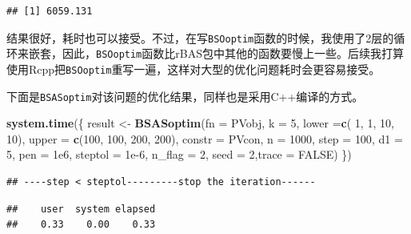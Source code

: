 \documentclass[]{ctexbook}
\newenvironment{Shaded}{\begin{snugshade}}{\end{snugshade}}
\newcommand{\KeywordTok}[1]{\textcolor[rgb]{0.13,0.29,0.53}{\textbf{#1}}}
\newcommand{\DataTypeTok}[1]{\textcolor[rgb]{0.13,0.29,0.53}{#1}}
\newcommand{\DecValTok}[1]{\textcolor[rgb]{0.00,0.00,0.81}{#1}}
\newcommand{\FloatTok}[1]{\textcolor[rgb]{0.00,0.00,0.81}{#1}}
\newcommand{\StringTok}[1]{\textcolor[rgb]{0.31,0.60,0.02}{#1}}
\newcommand{\OtherTok}[1]{\textcolor[rgb]{0.56,0.35,0.01}{#1}}
\newcommand{\OperatorTok}[1]{\textcolor[rgb]{0.81,0.36,0.00}{\textbf{#1}}}
\newcommand{\NormalTok}[1]{#1}
\theoremstyle{definition}
\theoremstyle{definition}
\theoremstyle{definition}
\theoremstyle{remark}
\begin{document}
\begin{verbatim}
## [1] 6059.131
\end{verbatim}

结果很好，耗时也可以接受。不过，在写\texttt{BSOoptim}函数的时候，我使用了2层的循环来嵌套，因此，\texttt{BSOoptim}函数比rBAS包中其他的函数要慢上一些。后续我打算使用Rcpp把\texttt{BSOoptim}重写一遍，这样对大型的优化问题耗时会更容易接受。

下面是\texttt{BSASoptim}对该问题的优化结果，同样也是采用C++编译的方式。

\begin{Shaded}
\begin{Highlighting}[]
\KeywordTok{system.time}\NormalTok{(\{}
\NormalTok{  result <-}\StringTok{ }\KeywordTok{BSASoptim}\NormalTok{(}\DataTypeTok{fn =}\NormalTok{ PVobj,}
                      \DataTypeTok{k =} \DecValTok{5}\NormalTok{,}
                      \DataTypeTok{lower =}\KeywordTok{c}\NormalTok{( }\DecValTok{1}\NormalTok{, }\DecValTok{1}\NormalTok{, }\DecValTok{10}\NormalTok{, }\DecValTok{10}\NormalTok{),}
                      \DataTypeTok{upper =} \KeywordTok{c}\NormalTok{(}\DecValTok{100}\NormalTok{, }\DecValTok{100}\NormalTok{, }\DecValTok{200}\NormalTok{, }\DecValTok{200}\NormalTok{),}
                      \DataTypeTok{constr =}\NormalTok{ PVcon,}
                      \DataTypeTok{n =} \DecValTok{1000}\NormalTok{,}
                      \DataTypeTok{step =} \DecValTok{100}\NormalTok{,}
                      \DataTypeTok{d1 =} \DecValTok{5}\NormalTok{,}
                      \DataTypeTok{pen =} \FloatTok{1e6}\NormalTok{,}
                      \DataTypeTok{steptol =} \FloatTok{1e-6}\NormalTok{,}
                      \DataTypeTok{n_flag =} \DecValTok{2}\NormalTok{,}
                      \DataTypeTok{seed =} \DecValTok{2}\NormalTok{,}\DataTypeTok{trace =} \OtherTok{FALSE}\NormalTok{)}
\NormalTok{\})}
\end{Highlighting}
\end{Shaded}

\begin{verbatim}
## ----step < steptol---------stop the iteration------
\end{verbatim}

\begin{verbatim}
##    user  system elapsed 
##    0.33    0.00    0.33
\end{verbatim}

\begin{Shaded}
\end{Shaded}
\end{document}
